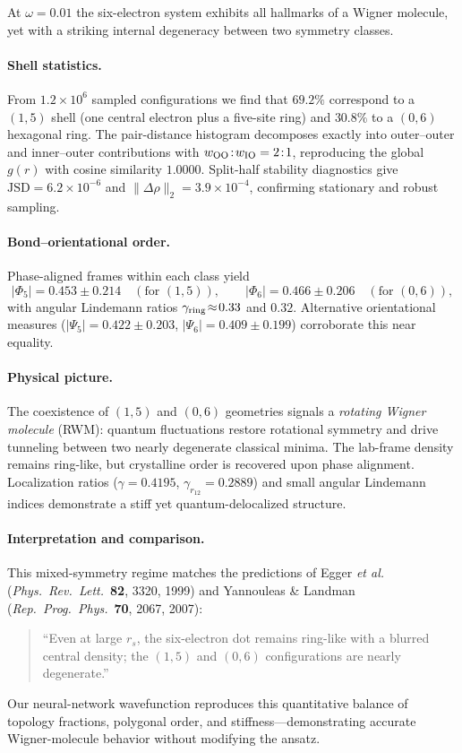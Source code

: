 At $\omega=0.01$ the six-electron system exhibits all hallmarks of a Wigner molecule, yet with a striking internal degeneracy between two symmetry classes.

\paragraph{Shell statistics.}
From $1.2{\times}10^6$ sampled configurations we find that $69.2\%$ correspond to a $(1,5)$ shell (one central electron plus a five-site ring) and $30.8\%$ to a $(0,6)$ hexagonal ring.  
The pair-distance histogram decomposes exactly into outer–outer and inner–outer contributions with $w_{\rm OO}\!:\!w_{\rm IO}=2\!:\!1$, reproducing the global $g(r)$ with cosine similarity $1.0000$.  
Split-half stability diagnostics give $\text{JSD}=6.2{\times}10^{-6}$ and $\|{\Delta}\rho\|_2=3.9{\times}10^{-4}$, confirming stationary and robust sampling.

\paragraph{Bond–orientational order.}
Phase-aligned frames within each class yield
\[
|\Phi_5| = 0.453 \pm 0.214 \quad (\text{for $(1,5)$}), \qquad
|\Phi_6| = 0.466 \pm 0.206 \quad (\text{for $(0,6)$}),
\]
with angular Lindemann ratios $\gamma_{\rm ring}\!\approx\!0.33$ and $0.32$.  
Alternative orientational measures ($|\Psi_5|{=}0.422\!\pm\!0.203$, $|\Psi_6|{=}0.409\!\pm\!0.199$) corroborate this near equality.

\paragraph{Physical picture.}
The coexistence of $(1,5)$ and $(0,6)$ geometries signals a \emph{rotating Wigner molecule} (RWM): quantum fluctuations restore rotational symmetry and drive tunneling between two nearly degenerate classical minima.  
The lab-frame density remains ring-like, but crystalline order is recovered upon phase alignment.  
Localization ratios ($\gamma=0.4195$, $\gamma_{r_{12}}=0.2889$) and small angular Lindemann indices demonstrate a stiff yet quantum-delocalized structure.

\paragraph{Interpretation and comparison.}
This mixed-symmetry regime matches the predictions of Egger \emph{et al.} (\emph{Phys.\ Rev.\ Lett.}\ \textbf{82}, 3320, 1999) and Yannouleas \& Landman (\emph{Rep.\ Prog.\ Phys.}\ \textbf{70}, 2067, 2007):
\begin{quote}
“Even at large $r_s$, the six-electron dot remains ring-like with a blurred central density; the $(1,5)$ and $(0,6)$ configurations are nearly degenerate.”
\end{quote}
Our neural-network wavefunction reproduces this quantitative balance of topology fractions, polygonal order, and stiffness—demonstrating accurate Wigner-molecule behavior without modifying the ansatz.

